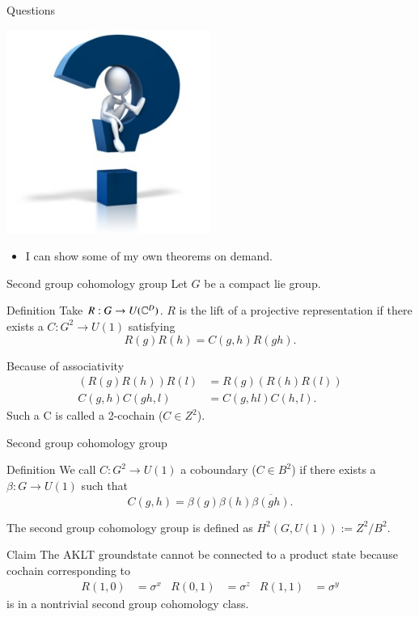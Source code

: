 \documentclass{beamer}
\begin{document}
\begin{frame}{Questions}
	\begin{center}
		\includegraphics[width=0.5\textwidth]{Figures/AnyQuestions.jpg}
	\end{center}
	\begin{itemize}
		\item I can show some of my own theorems on demand.
	\end{itemize}
\end{frame}

\begin{frame}{Second group cohomology group}
	Let $G$ be a compact lie group.
	\begin{block}{Definition}
		Take $R:G\rightarrow U(\mathbb{C}^D)$. $R$ is the lift of a projective representation if there exists a $C:G^2\rightarrow U(1)$ satisfying
		\[R(g)R(h)=C(g,h)R(gh).\]
	\end{block}
	\pause
	Because of associativity
	\begin{align*}
		(R(g)R(h))R(l)&=R(g)(R(h)R(l))\\
		C(g,h)C(gh,l)&=C(g,hl)C(h,l).
	\end{align*}
	Such a C is called a 2-cochain ($C\in Z^2$).
\end{frame}

\begin{frame}{Second group cohomology group}
	\begin{block}{Definition}
		We call $C:G^2\rightarrow U(1)$ a coboundary ($C\in B^2$) if there exists a $\beta:G\rightarrow U(1)$ such that
		\[C(g,h)=\beta(g)\beta(h)\overline{\beta(gh)}.\]
	\end{block}
	The second group cohomology group is defined as $H^2(G,U(1)):=Z^2/B^2$.
	\pause
	\begin{block}{Claim}
		The AKLT groundstate cannot be connected to a product state because cochain corresponding to
		\begin{align*}
			R(1,0)&=\sigma^x&R(0,1)&=\sigma^z&R(1,1)&=\sigma^y
		\end{align*}
		is in a nontrivial second group cohomology class.
	\end{block}
\end{frame}
\end{document}
